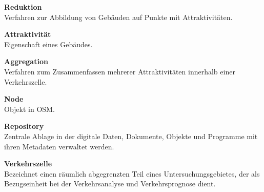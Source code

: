 \documentclass[parskip=full]{scrartcl} %
\begin{document}
\textbf{Reduktion}\\
Verfahren zur Abbildung von Gebäuden auf Punkte mit Attraktivitäten.

\textbf{Attraktivität}\\
Eigenschaft eines Gebäudes.

\textbf{Aggregation}\\
Verfahren zum Zusammenfassen mehrerer Attraktivitäten innerhalb einer Verkehrszelle.

\textbf{Node}\\
Objekt in OSM.

\textbf{Repository}\\
Zentrale Ablage in der digitale Daten, Dokumente, Objekte und Programme mit ihren Metadaten verwaltet werden.

\textbf{Verkehrszelle}\\
Bezeichnet einen räumlich abgegrenzten Teil eines Untersuchungsgebietes, der als Bezugseinheit bei der Verkehrsanalyse und Verkehrsprognose dient.

\newpage
\end{document}
